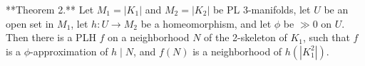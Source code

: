 **Theorem 2.** Let $M_1 = |K_1|$ and $M_2 = |K_2|$ be PL 3-manifolds, let $U$ be an open set in $M_1$, let $h: U \to M_2$ be a homeomorphism, and let $\phi$ be $\gg 0$ on $U$. Then there is a PLH $f$ on a neighborhood $N$ of the 2-skeleton of $K_1$, such that $f$ is a $\phi$-approximation of $h \mid N$, and $f(N)$ is a neighborhood of $h(|K_1^2|)$.
